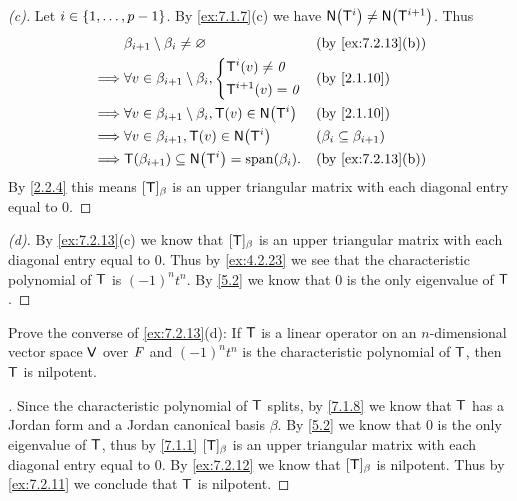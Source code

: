\begin{proof}[(c)]
  Let \(i \in \left\lbrace1, \dots, p - 1\right\rbrace\).
  By \cref{ex:7.1.7}(c) we have \(\ns{\T^i} \neq \ns{\T^{i + 1}}\).
  Thus
  \begin{align*}
             & \beta_{i + 1} \setminus \beta_i \neq \varnothing                   &  & \by{ex:7.2.13}[b]                 \\
    \implies & \forall v \in \beta_{i + 1} \setminus \beta_i, \begin{dcases}
                                                                \T^i(v) \neq \zv \\
                                                                \T^{i + 1}(v) = \zv
                                                              \end{dcases}      &  & \by{2.1.10}                         \\
    \implies & \forall v \in \beta_{i + 1} \setminus \beta_i, \T(v) \in \ns{\T^i} &  & \by{2.1.10}                       \\
    \implies & \forall v \in \beta_{i + 1}, \T(v) \in \ns{\T^i}                   &  & (\beta_i \subseteq \beta_{i + 1}) \\
    \implies & \T(\beta_{i + 1}) \subseteq \ns{\T^i} = \spn{\beta_i}.             &  & \by{ex:7.2.13}[b]
  \end{align*}
  By \cref{2.2.4} this means \([\mathsf{T}]_{\beta}\) is an upper triangular matrix with each diagonal entry equal to \(0\).
\end{proof}

\begin{proof}[(d)]
  By \cref{ex:7.2.13}(c) we know that \([\mathsf{T}]_{\beta}\) is an upper triangular matrix with each diagonal entry equal to \(0\).
  Thus by \cref{ex:4.2.23} we see that the characteristic polynomial of \(\mathsf{T}\) is \((-1)^n t^n\).
  By \cref{5.2} we know that \(0\) is the only eigenvalue of \(\mathsf{T}\).
\end{proof}

\begin{ex}\label{ex:7.2.14}
  Prove the converse of \cref{ex:7.2.13}(d):
  If \(\mathsf{T}\) is a linear operator on an \(n\)-dimensional vector space \(\mathsf{V}\) over \(\mathit{F}\) and \((-1)^n t^n\) is the characteristic polynomial of \(\mathsf{T}\), then \(\mathsf{T}\) is nilpotent.
\end{ex}

\begin{proof}[]
  Since the characteristic polynomial of \(\mathsf{T}\) splits, by \cref{7.1.8} we know that \(\mathsf{T}\) has a Jordan form and a Jordan canonical basis \(\beta\).
  By \cref{5.2} we know that \(0\) is the only eigenvalue of \(\mathsf{T}\), thus by \cref{7.1.1} \([\mathsf{T}]_{\beta}\) is an upper triangular matrix with each diagonal entry equal to \(0\).
  By \cref{ex:7.2.12} we know that \([\mathsf{T}]_{\beta}\) is nilpotent.
  Thus by \cref{ex:7.2.11} we conclude that \(\mathsf{T}\) is nilpotent.
\end{proof}

